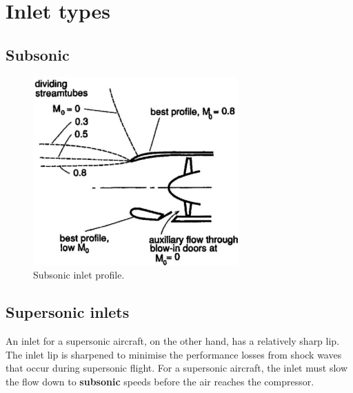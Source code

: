 \documentclass[class=report, crop=false, 12pt,a4paper]{standalone}
\begin{document}
\section{Inlet types}
\subsection{Subsonic}
\begin{figure}[H]
    \centering
    \includegraphics[width = 0.7\textwidth]{../img/diagram45.png}
    \caption{Subsonic inlet profile.}
\end{figure}
\subsection{Supersonic inlets}
An inlet for a supersonic aircraft, on the other hand, has a relatively sharp lip. The inlet lip is sharpened to minimise the performance losses from shock waves that occur during supersonic flight. For a supersonic aircraft, the inlet must slow the flow down to \textbf{subsonic} speeds before the air reaches the compressor.
\end{document}
